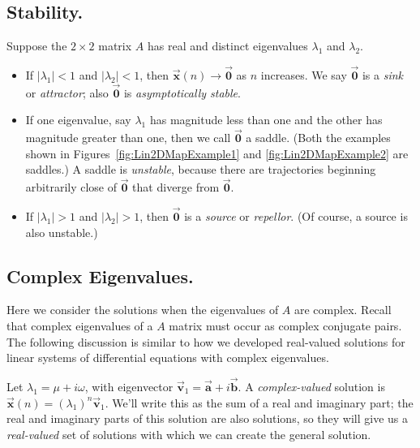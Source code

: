 \documentclass[reqno]{immbook}
\newcommand{\BA}{\vec{\textbf{a}}}
\newcommand{\BB}{\vec{\textbf{b}}}
\newcommand{\BV}{\vec{\textbf{v}}}
\newcommand{\BX}{\vec{\textbf{x}}}
\newcommand{\BZero}{\vec{\textbf{0}}}  %
\numberwithin{equation}{chapter}
\numberwithin{question}{section}
\numberwithin{theorem}{chapter}
\numberwithin{figure}{chapter}
\theoremstyle{definition}
\begin{document}
\subsection*{Stability.}
Suppose the $2\times 2$ matrix $A$ has real and distinct eigenvalues
$\lambda_1$ and $\lambda_2$.
\begin{itemize}
\item If $|\lambda_1|<1$ and $|\lambda_2|<1$, then
$\BX(n)\rightarrow\BZero$ as $n$ increases.  We say
$\BZero$ is a \emph{sink} or \emph{attractor}; also
$\BZero$ is \emph{asymptotically stable}.
\item If one eigenvalue, say $\lambda_1$ has magnitude less than
one and the other has magnitude greater than one, then
we call $\BZero$ a saddle.  (Both the examples shown in
Figures~\ref{fig:Lin2DMapExample1} and \ref{fig:Lin2DMapExample2}
are saddles.) A saddle is \emph{unstable}, because there
are trajectories beginning arbitrarily close of $\BZero$ that
diverge from $\BZero$.
\item If $|\lambda_1|>1$ and $|\lambda_2|>1$, then
$\BZero$ is a \emph{source} or \emph{repellor}.  (Of course,
a source is also unstable.)
\end{itemize}
%
%
\subsection*{Complex Eigenvalues.}
Here we consider the solutions when the eigenvalues of
$A$ are complex.  Recall that complex eigenvalues of a $A$
matrix must occur as complex conjugate pairs.
The following discussion is similar to how
we developed real-valued solutions for linear systems
of differential equations with complex eigenvalues.
 
Let $\lambda_1=\mu + i\omega$,
with eigenvector $\BV_1 = \BA + i \BB$.
A \emph{complex-valued} solution is
$\BX(n) = (\lambda_1)^n\BV_1$.
We'll write this as the sum of a real and imaginary part;
the real and imaginary parts of this solution are also solutions,
so they will give us a \emph{real-valued} set of solutions
with which we can create the general solution.
\end{document}
